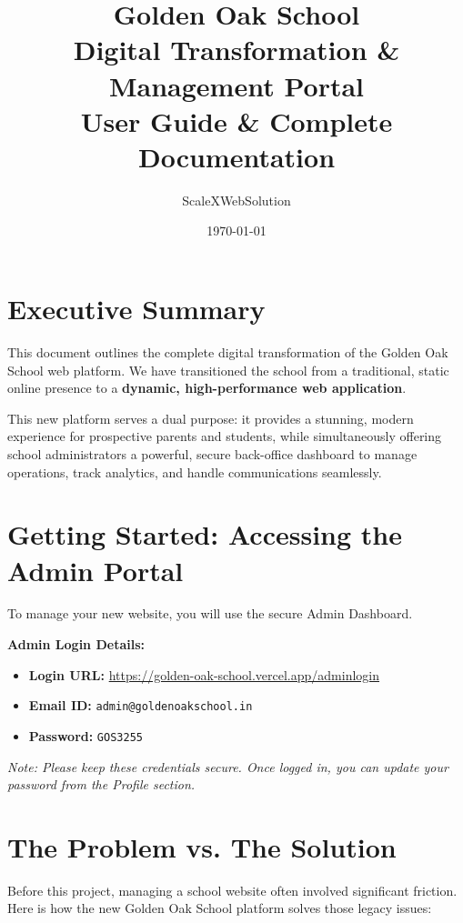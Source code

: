 \documentclass[11pt,a4paper]{article}
\title{Golden Oak School\\ Digital Transformation \& Management Portal\\ User Guide \& Complete Documentation}
\author{ScaleXWebSolution}
\date{\today}
\begin{document}
\maketitle
\tableofcontents
\newpage

\section{Executive Summary}
This document outlines the complete digital transformation of the Golden Oak School web platform. We have transitioned the school from a traditional, static online presence to a \textbf{dynamic, high-performance web application}. 

This new platform serves a dual purpose: it provides a stunning, modern experience for prospective parents and students, while simultaneously offering school administrators a powerful, secure back-office dashboard to manage operations, track analytics, and handle communications seamlessly.

\section{Getting Started: Accessing the Admin Portal}
To manage your new website, you will use the secure Admin Dashboard.

\textbf{Admin Login Details:}
\begin{itemize}
    \item \textbf{Login URL:} \href{https://golden-oak-school.vercel.app/adminlogin}{https://golden-oak-school.vercel.app/adminlogin}
    \item \textbf{Email ID:} \texttt{admin@goldenoakschool.in}
    \item \textbf{Password:} \texttt{GOS3255}
\end{itemize}

\textit{Note: Please keep these credentials secure. Once logged in, you can update your password from the Profile section.}

\section{The Problem vs. The Solution}

Before this project, managing a school website often involved significant friction. Here is how the new Golden Oak School platform solves those legacy issues:
\end{document}
